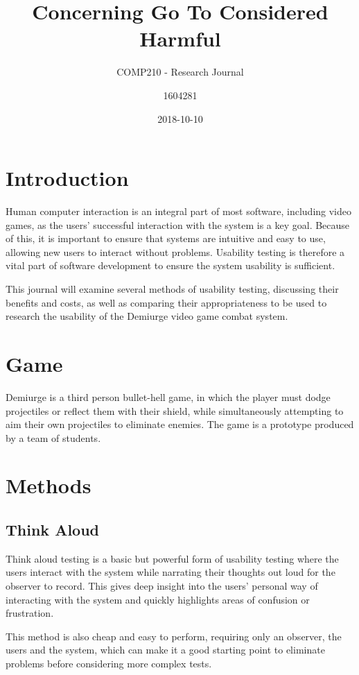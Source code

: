 \documentclass{scrartcl}
\title{Concerning Go To Considered Harmful}
\subtitle{COMP210 - Research Journal}
\date{2018-10-10}
\author{1604281}
\begin{document}
\maketitle
{}


\section{Introduction}
Human computer interaction is an integral part of most software, including video games, as the users' successful interaction with the system is a key goal. Because of this, it is important to ensure that systems are intuitive and easy to use, allowing new users to interact without problems. Usability testing is therefore a vital part of software development to ensure the system usability is sufficient. 

This journal will examine several methods of usability testing, discussing their benefits and costs, as well as comparing their appropriateness to be used to research the usability of the Demiurge video game combat system.

\section{Game}
Demiurge is a third person bullet-hell game, in which the player must dodge projectiles or reflect them with their shield, while simultaneously attempting to aim their own projectiles to eliminate enemies. The game is a prototype produced by a team of students.


\section{Methods}

\subsection{Think Aloud}
Think aloud testing is a basic but powerful form of usability testing where the users interact with the system while narrating their thoughts out loud for the observer to record. This gives deep insight into the users' personal way of interacting with the system and quickly highlights areas of confusion or frustration.

This method is also cheap and easy to perform, requiring only an observer, the users and the system, which can make it a good starting point to eliminate problems before considering more complex tests.
\end{document}
